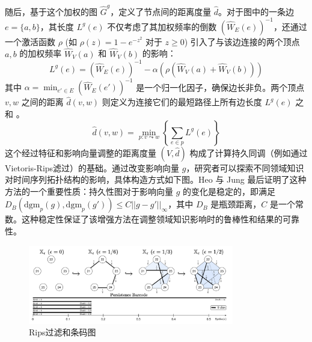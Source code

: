随后，基于这个加权的图 $\hat{G}^g$，定义了节点间的距离度量 $\hat{d}$。对于图中的一条边 $e=\{a,b\}$，其长度 $L^g(e)$ 不仅考虑了其加权频率的倒数 $(\hat{W}_E(e))^{-1}$，还通过一个激活函数 $\rho$ (如 $\rho(z)=1-e^{-z^2}$ 对于 $z \ge 0$) 引入了与该边连接的两个顶点 $a,b$ 的加权频率 $\hat{W}_V(a)$ 和 $\hat{W}_V(b)$ 的影响：
\begin{equation}
    L^g(e) = (\hat{W}_E(e))^{-1} - \alpha (\rho(\hat{W}_V(a) + \hat{W}_V(b)))
\end{equation}
其中 $\alpha = \min_{e' \in E} (\hat{W}_E(e'))^{-1}$ 是一个归一化因子，确保边长非负。两个顶点 $v,w$ 之间的距离 $\hat{d}(v,w)$ 则定义为连接它们的最短路径上所有边长度 $L^g(e)$ 之和 。
\begin{equation}
    \hat{d}(v,w) = \min_{p: v \leadsto w} \left\{ \sum_{e \in p} L^g(e) \right\}
\end{equation}
这个经过特征和影响向量调整的距离度量 $(V, \hat{d})$ 构成了计算持久同调（例如通过Vietoris-Rips滤过）的基础。通过改变影响向量 $g$，研究者可以探索不同领域知识对时间序列拓扑结构的影响，具体构造方式如下图。Heo 与 Jung 最后证明了这种方法的一个重要性质：持久性图对于影响向量 $g$ 的变化是稳定的，即满足 $D_B(\text{dgm}_p(g), \text{dgm}_p(g')) \le C ||g-g'||_\infty$，其中 $D_B$ 是瓶颈距离，$C$ 是一个常数。这种稳定性保证了该增强方法在调整领域知识影响时的鲁棒性和结果的可靠性。
\clearpage
\begin{figure}[thbp!]
    \centering
    \includegraphics[width=0.8\textwidth]{figure/特征化时间序列.png}
    \caption{Rips过滤和条码图}
    \label{fig:phtsi_algorithm}
\end{figure}


